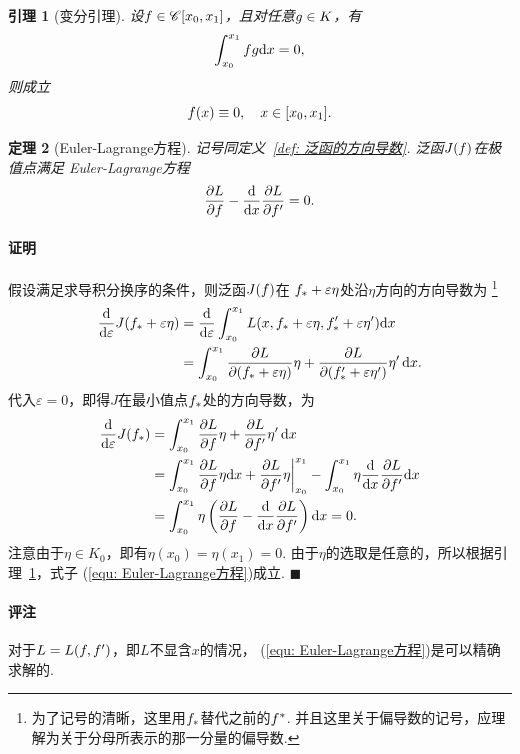 \documentclass[12pt, a4paper]{article}
\theoremstyle{margin}
\newtheorem{thm}{定理}
\newtheorem{lemma}[thm]{引理}
\newcommand{\hp}{^\prime}
\newcommand{\ms}{\mathscr}
\newcommand{\f}{\mathnormal{f}}
\newcommand{\g}{\mathnormal{g}}
\newcommand{\rd}{\mathrm{d}}
\newcommand{\vep}{\varepsilon}
\newcommand\lemmaref[1]{引理~\ref{#1}}
\newcommand\defref[1]{定义~\ref{#1}}
\newcommand\equref[1]{(\ref{#1})}
\newcommand{\remark}{\paragraph{评注}}
\newcommand{\proof}{\paragraph{证明}}
\begin{document}
  \begin{lemma}[变分引理]
    \label{lemma: 变分引理}
    设$\f\in\ms{C}[x_0,x_1]$，且对任意$\g\in K$，有
    \[
      \int_{x_0}^{x_1}\f\g \rd x =0,
    \]
    则成立
    \[
      \f(x)\equiv 0,\quad x\in[x_0, x_1].
    \]
  \end{lemma}

  \begin{thm}[Euler-Lagrange方程]
    \label{thm: Euler-Lagrange方程}
    记号同\defref{def: 泛函的方向导数}. 泛函$J(\f)$在极值点满足
    Euler-Lagrange方程
    \begin{equation}
      \label{equ: Euler-Lagrange方程}
      \frac{\partial L}{\partial\f} - \frac{\rd}{\rd x}\frac{\partial L}{\partial\f\hp} = 0.
    \end{equation}
  \end{thm}
  \proof
    假设满足求导积分换序的条件，则泛函$J(\f)$在
    $\f_*+\vep\eta$处沿$\eta$方向的方向导数为
    \footnote{为了记号的清晰，这里用$\f_*$替代之前的$\f^*$.
    并且这里关于偏导数的记号，应理解为关于分母所表示的那一分量的偏导数. }
    \[\begin{split}
      \frac{\rd}{\rd\vep}J(\f_*+\vep\eta) &=
      \frac{\rd}{\rd\vep}\int_{x_0}^{x_1}L(x,\f_*+\vep\eta,\f_*\hp+\vep\eta\hp)\rd x\\
      &= \int_{x_0}^{x_1} \frac{\partial L}{\partial (\f_*+\vep\eta)}\eta
      +\frac{\partial L}{\partial (\f_*\hp+\vep\eta\hp)}\eta\hp\,\rd x.
    \end{split}\]
    代入$\vep=0$，即得$J$在最小值点$\f_*$处的方向导数，为
    \[\begin{split}
      \frac{\rd}{\rd\vep}J(\f_*) &=
      \int_{x_0}^{x_1} \frac{\partial L}{\partial \f}\eta
      +\frac{\partial L}{\partial \f\hp}\eta\hp\,\rd x \\
      &= \int_{x_0}^{x_1} \frac{\partial L}{\partial\f}\eta\rd x
      + \frac{\partial L}{\partial\f\hp}\eta\bigg|_{x_0}^{x_1}
      - \int_{x_0}^{x_1}\eta\frac{\rd}{\rd x}\frac{\partial L}{\partial \f\hp}\rd x\\
      &= \int_{x_0}^{x_1} \eta\left( \frac{\partial L}{\partial\f}
      - \frac{\rd}{\rd x}\frac{\partial L}{\partial\f\hp} \right) \rd x = 0.
    \end{split}\]
    注意由于$\eta\in K_0$，即有$\eta(x_0) = \eta(x_1) = 0$.
    由于$\eta$的选取是任意的，所以根据\lemmaref{lemma: 变分引理}，式子
    \equref{equ: Euler-Lagrange方程}成立. $\blacksquare$
  \remark
    对于$L = L(\f,\f\hp)$，即$L$不显含$x$的情况，
    \equref{equ: Euler-Lagrange方程}是可以精确求解的.
\end{document}
